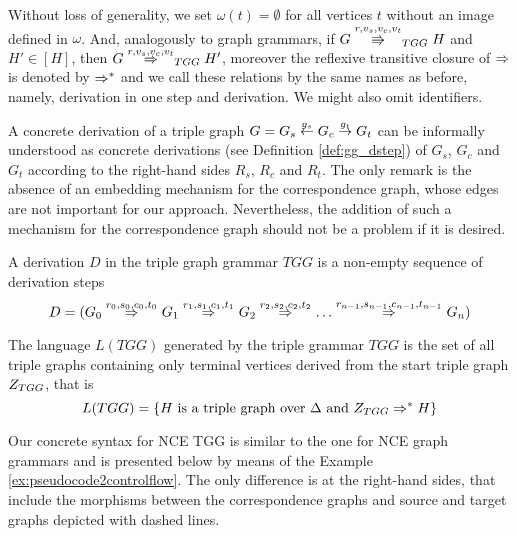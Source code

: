 \documentclass[runningheads]{llncs}
\begin{document}
Without loss of generality, we set $\omega(t) = \emptyset$ for all vertices $t$ without an image defined in $\omega$. And, analogously to graph grammars, if $G \cderiv{r}{v_s,v_c,v_t}{TGG} H$ and $H' \in [H]$, then $G \tderiv{r}{v_s,v_c,v_t}{TGG} H'$, moreover the reflexive transitive closure of $\tderiv{}{}{}$ is denoted by $\Rightarrow^*_{}$ and we call these relations by the same names as before, namely, derivation in one step and derivation. We might also omit identifiers.

A concrete derivation of a triple graph $G = G_s \overset{g_s}{\leftarrow} G_c \overset{g_t}{\rightarrow} G_t$ can be informally understood as concrete derivations (see Definition \ref{def:gg_dstep}) of $G_s$, $G_c$ and $G_t$ according to the right-hand sides $R_s$, $R_c$ and $R_t$. The only remark is the absence of an embedding mechanism for the correspondence graph, whose edges are not important for our approach. Nevertheless, the addition of such a mechanism for the correspondence graph should not be a problem if it is desired.

\begin{definition}
	A derivation $D$ in the triple graph grammar $TGG$ is a non-empty sequence of derivation steps
	\begin{equation*}
		D = (G_0 \tderiv{r_0}{s_0,c_0,t_0}{} G_1 \tderiv{r_1}{s_1,c_1,t_1}{} G_2 \tderiv{r_2}{s_2,c_2,t_2}{} \dots \tderiv{r_{n-1}}{s_{n-1},c_{n-1},t_{n-1}}{} G_n)
	\end{equation*}
\end{definition}

\begin{definition}
	\label{def:tlanguage}
	The language $L(TGG)$ generated by the triple grammar $TGG$ is the set of all triple graphs containing only terminal vertices derived from the start triple graph $Z_{TGG}$, that is
	\begin{equation*}
		L(TGG) = \{H \text{ is a triple graph over } \Delta \text{ and } Z_{TGG} \Rightarrow^*_{} H\}
	\end{equation*}
\end{definition}

Our concrete syntax for NCE TGG is similar to the one for NCE graph grammars and is presented below by means of the Example \ref{ex:pseudocode2controlflow}. The only difference is at the right-hand sides, that include the morphisms between the correspondence graphs and source and target graphs depicted with dashed lines.
\end{document}
